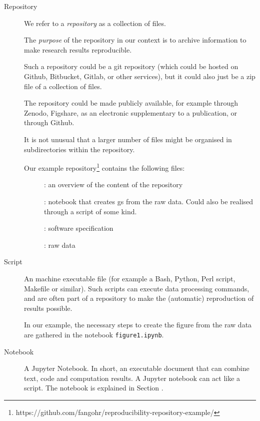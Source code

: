 \begin{description}
\item[Repository] We refer to a \emph{repository} as a collection of files.

The \emph{purpose} of the repository in our context is to archive information to make
research results reproducible.

Such a repository could be a git repository (which could be hosted on Github,
Bitbucket, Gitlab, or other services), but it could also just be a zip file of a
collection of files.

The repository could be made publicly available, for example through Zenodo,
Figshare, as an electronic supplementary to a publication, or through Github.

It is not unusual that a larger number of files might be
organised in subdirectories within the repository.

Our example repository\footnote{
  https://github.com/fangohr/reproducibility-repository-example/} \cite{ReproducibilityRepositoryExample2022} contains the following files:

\begin{description}
\item[]: an overview of the content of the repository
\item[]: notebook that creates gs from
  the raw data. Could also be realised through a script of some kind.
\item[]: software specification
\item[]: raw data
\end{description}

\item[Script] An machine executable file (for example a Bash, Python, Perl
script, Makefile or similar). Such scripts can execute data processing commands,
and are often part of a repository to make the (automatic) reproduction of
results possible.

In our example, the necessary steps to create the figure from the raw data are
gathered in the notebook \texttt{figure1.ipynb}.

\item[Notebook] A Jupyter Notebook. In short, an executable document that can
  combine text, code and computation results. A Jupyter notebook can act like a
  script. The notebook is explained in Section .


\end{description}
